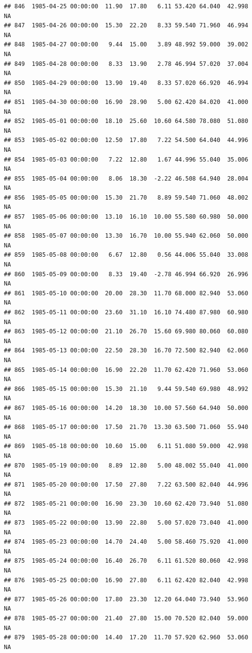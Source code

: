 \documentclass{article}\usepackage{graphicx, color}
\makeatletter
\newenvironment{kframe}{%
 \def\at@end@of@kframe{}%
 \ifinner\ifhmode%
  \def\at@end@of@kframe{\end{minipage}}%
  \begin{minipage}{\columnwidth}%
 \fi\fi%
 \def\FrameCommand##1{\hskip\@totalleftmargin \hskip-\fboxsep
 \colorbox{shadecolor}{##1}\hskip-\fboxsep
     \hskip-\linewidth \hskip-\@totalleftmargin \hskip\columnwidth}%
 \MakeFramed {\advance\hsize-\width
   \@totalleftmargin\z@ \linewidth\hsize
   \@setminipage}}%
 {\par\unskip\endMakeFramed%
 \at@end@of@kframe}
\newenvironment{knitrout}{}{} %
\makeatother
\begin{document}
\begin{knitrout}
\begin{kframe}
\begin{verbatim}
## 846  1985-04-25 00:00:00  11.90  17.80   6.11 53.420 64.040  42.998     NA
## 847  1985-04-26 00:00:00  15.30  22.20   8.33 59.540 71.960  46.994     NA
## 848  1985-04-27 00:00:00   9.44  15.00   3.89 48.992 59.000  39.002     NA
## 849  1985-04-28 00:00:00   8.33  13.90   2.78 46.994 57.020  37.004     NA
## 850  1985-04-29 00:00:00  13.90  19.40   8.33 57.020 66.920  46.994     NA
## 851  1985-04-30 00:00:00  16.90  28.90   5.00 62.420 84.020  41.000     NA
## 852  1985-05-01 00:00:00  18.10  25.60  10.60 64.580 78.080  51.080     NA
## 853  1985-05-02 00:00:00  12.50  17.80   7.22 54.500 64.040  44.996     NA
## 854  1985-05-03 00:00:00   7.22  12.80   1.67 44.996 55.040  35.006     NA
## 855  1985-05-04 00:00:00   8.06  18.30  -2.22 46.508 64.940  28.004     NA
## 856  1985-05-05 00:00:00  15.30  21.70   8.89 59.540 71.060  48.002     NA
## 857  1985-05-06 00:00:00  13.10  16.10  10.00 55.580 60.980  50.000     NA
## 858  1985-05-07 00:00:00  13.30  16.70  10.00 55.940 62.060  50.000     NA
## 859  1985-05-08 00:00:00   6.67  12.80   0.56 44.006 55.040  33.008     NA
## 860  1985-05-09 00:00:00   8.33  19.40  -2.78 46.994 66.920  26.996     NA
## 861  1985-05-10 00:00:00  20.00  28.30  11.70 68.000 82.940  53.060     NA
## 862  1985-05-11 00:00:00  23.60  31.10  16.10 74.480 87.980  60.980     NA
## 863  1985-05-12 00:00:00  21.10  26.70  15.60 69.980 80.060  60.080     NA
## 864  1985-05-13 00:00:00  22.50  28.30  16.70 72.500 82.940  62.060     NA
## 865  1985-05-14 00:00:00  16.90  22.20  11.70 62.420 71.960  53.060     NA
## 866  1985-05-15 00:00:00  15.30  21.10   9.44 59.540 69.980  48.992     NA
## 867  1985-05-16 00:00:00  14.20  18.30  10.00 57.560 64.940  50.000     NA
## 868  1985-05-17 00:00:00  17.50  21.70  13.30 63.500 71.060  55.940     NA
## 869  1985-05-18 00:00:00  10.60  15.00   6.11 51.080 59.000  42.998     NA
## 870  1985-05-19 00:00:00   8.89  12.80   5.00 48.002 55.040  41.000     NA
## 871  1985-05-20 00:00:00  17.50  27.80   7.22 63.500 82.040  44.996     NA
## 872  1985-05-21 00:00:00  16.90  23.30  10.60 62.420 73.940  51.080     NA
## 873  1985-05-22 00:00:00  13.90  22.80   5.00 57.020 73.040  41.000     NA
## 874  1985-05-23 00:00:00  14.70  24.40   5.00 58.460 75.920  41.000     NA
## 875  1985-05-24 00:00:00  16.40  26.70   6.11 61.520 80.060  42.998     NA
## 876  1985-05-25 00:00:00  16.90  27.80   6.11 62.420 82.040  42.998     NA
## 877  1985-05-26 00:00:00  17.80  23.30  12.20 64.040 73.940  53.960     NA
## 878  1985-05-27 00:00:00  21.40  27.80  15.00 70.520 82.040  59.000     NA
## 879  1985-05-28 00:00:00  14.40  17.20  11.70 57.920 62.960  53.060     NA

\end{verbatim}
\end{kframe}
\end{knitrout}
\end{document}
